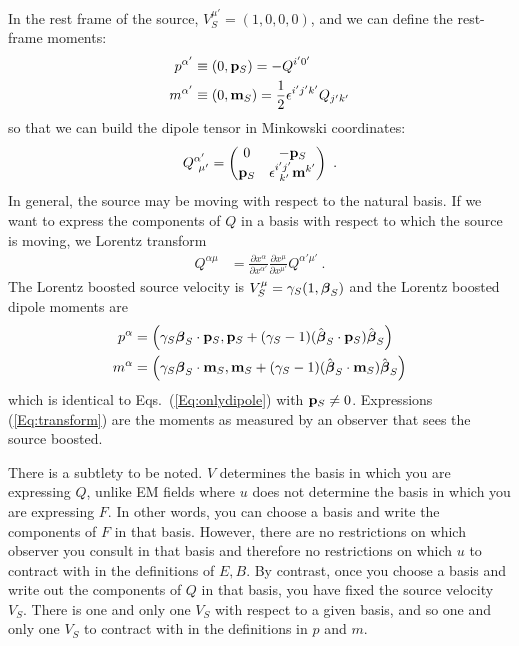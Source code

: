 In the rest frame of the source, $V_S^{\mu'} = (1, 0, 0, 0)$, and we can
define the rest-frame moments:
\begin{align}
p^{\alpha '} &\equiv (0,{\bf p}_S) = -Q^{i'0'} \nonumber \\
m^{\alpha '}& \equiv (0, {\bf m}_S) = \frac{1}{2}\epsilon^{i'j'k'} Q_{j'k'}
\end{align}
so that we can build the dipole tensor in Minkowski coordinates:
\begin{equation}
Q^{\alpha'}_{\ \mu'}=\begin{pmatrix}
0 & -{\bf p}_S \\
{\bf p}_S & \epsilon^{i'j'}_{\ k'}{\bf m}^{k'}
\end{pmatrix} \ . 
\end{equation}
In general, the source may be moving with respect to the natural basis.
If we want to express the components of $Q$ in a basis with respect to
which the source is moving, we
Lorentz transform
\begin{align}
Q^{\alpha\mu} & =\frac{\partial x^{\alpha }}{\partial x^{\alpha '}}
\frac{\partial x^{\mu }}{\partial x^{\mu '}} Q^{\alpha' \mu'} \ .
\end{align}
The Lorentz boosted source velocity is
$V_S^{\mu}=\gamma_S(1,{\boldsymbol \beta}_S)$
and the Lorentz boosted dipole moments are
\begin{align}
p^{\alpha } & =\left ( \gamma_S {\boldsymbol \beta}_S \cdot {\bf p}_S, {\bf p}_S
+(\gamma_S-1)(\hat{\boldsymbol \beta}_S \cdot {\bf p}_S )\hat{\boldsymbol \beta}_S \right ) \nonumber \\
m^{\alpha } & = \left (\gamma_S {\boldsymbol \beta}_S \cdot {\bf m}_S, {\bf m}_S
+(\gamma_S-1)(\hat{\boldsymbol \beta}_S \cdot {\bf m}_S) \hat{\boldsymbol \beta}_S  \right )
\label{Eq:transform}
\end{align}
which is identical to Eqs.\ (\ref{Eq:onlydipole}) with 
${\bf p}_S\ne 0$.
Expressions
(\ref{Eq:transform}) 
are the moments as measured by an
observer that sees the source boosted.

There is a subtlety to be noted. $V$
determines the basis in which you are expressing $Q$, unlike EM fields
where $u$ does not determine the basis in which you are expressing $F$. In other words,
you can choose a basis and write the components of $F$ in that
basis. However, there are no restrictions on which observer you
consult in that basis and therefore no restrictions on which $u$
to contract with in the definitions of $E,B$. By contrast, once you
choose a basis and write out the components of $Q$ in that basis, you
have fixed the source velocity $V_S$. There
is one and only one $V_S$ with respect to a given basis, and so one
and only one $V_S$ to contract with in the definitions in $p$ and $m$.



%



%
\renewcommand\thesection{\thechapter.\arabic{section}}
